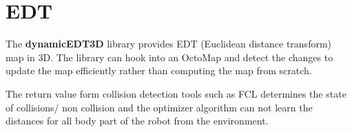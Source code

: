 \documentclass[letterpaper, 9pt, conference]{ieeeconf}  %
\begin{document}
\section{EDT}\label{EDT}



The \textbf{dynamicEDT3D} library \cite{dynamicEDT3D} provides EDT (Euclidean distance transform) map in 3D. 
The library can hook into an  OctoMap \cite{wurm2010octomap} and detect the changes to update the map efficiently rather than computing the map from scratch.


The return value form collision detection tools such as FCL \cite{pan2012fcl} determines the state of collisions/ non collision  and the optimizer algorithm can not learn the distances for all body part of the robot from the environment.


%
%
%
%
%
%
\end{document}
